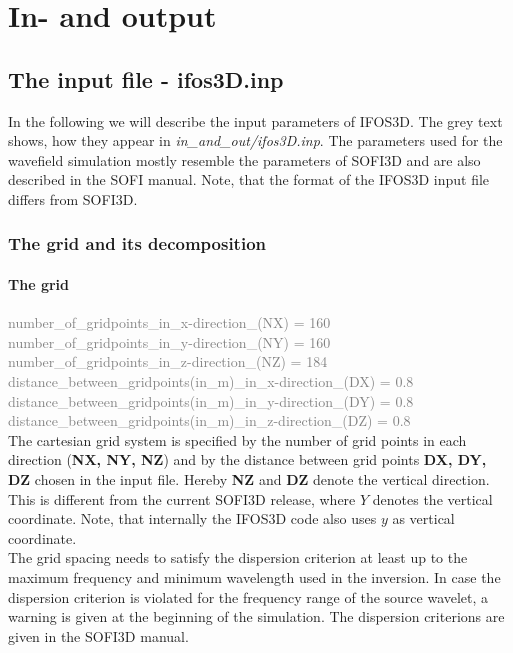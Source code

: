 \chapter{In- and output}
\section{The input file - ifos3D.inp}
In the following we will describe the input parameters of IFOS3D. The grey text shows, how they appear in \textit{in\_and\_out/ifos3D.inp}. The parameters used for the wavefield simulation mostly resemble the parameters of SOFI3D and are also described in the SOFI manual. Note, that the format of the IFOS3D input file differs from SOFI3D. 
\subsection{The grid and its decomposition}
\subsubsection*{The grid}
\textcolor{Gray}{number\_of\_gridpoints\_in\_x-direction\_(NX) = 160\\
number\_of\_gridpoints\_in\_y-direction\_(NY) = 160\\ 
number\_of\_gridpoints\_in\_z-direction\_(NZ) = 184\\
distance\_between\_gridpoints(in\_m)\_in\_x-direction\_(DX) = 0.8\\	
distance\_between\_gridpoints(in\_m)\_in\_y-direction\_(DY) = 0.8\\
distance\_between\_gridpoints(in\_m)\_in\_z-direction\_(DZ) = 0.8}\vspace{0.1cm}\\
The cartesian grid system is specified by the number of grid points in each direction (\textbf{NX, NY, NZ}) and by the distance between grid points \textbf{DX, DY, DZ} chosen in the input file. Hereby \textbf{NZ} and \textbf{DZ} denote the vertical direction. This is different from the current SOFI3D release, where $Y$ denotes the vertical coordinate. Note, that internally the IFOS3D code also uses $y$ as vertical coordinate. \\
The grid spacing needs to satisfy the dispersion criterion at least up to the maximum frequency and minimum wavelength used in the inversion. In case the dispersion criterion is violated for the frequency range of the source wavelet, a warning is given at the beginning of the simulation. The dispersion criterions are given in the SOFI3D manual.
